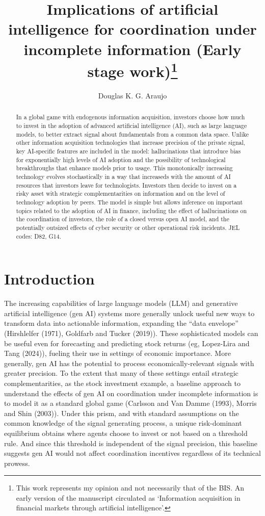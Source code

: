 \documentclass[
]{article}
\title{Implications of artificial intelligence for coordination under
incomplete information (Early stage work)\thanks{This work represents my
opinion and not necessarily that of the BIS. An early version of the
manuscript circulated as `Information acquisition in financial markets
through artificial intelligence'.}}
\author{Douglas K. G. Araujo}
\affil{%
                  Bank for International
Settlements, douglas.araujo@bis.org
              }
\date{}
\theoremstyle{plain}
\theoremstyle{definition}
\theoremstyle{remark}
\begin{document}
\maketitle
\begin{abstract}
In a global game with endogenous information acquisition, investors
choose how much to invest in the adoption of advanced artificial
intelligence (AI), such as large language models, to better extract
signal about fundamentals from a common data space. Unlike other
information acquisition technologies that increase precision of the
private signal, key AI-specific features are included in the model:
hallucinations that introduce bias for exponentially high levels of AI
adoption and the possibility of technological breakthroughs that enhance
models prior to usage. This monotonically increasing technology evolves
stochastically in a way that increaseds with the amount of AI resources
that investors leave for technologists. Investors then decide to invest
on a risky asset with strategic complementarities on information and on
the level of technology adoption by peers. The model is simple but
allows inference on important topics related to the adoption of AI in
finance, including the effect of hallucinations on the coordination of
investors, the role of a closed versus open AI model, and the
potentially outsized effects of cyber security or other operational risk
incidents. JEL codes: D82, G14.
\end{abstract}

\section{Introduction}\label{introduction}

The increasing capabilities of large language models (LLM) and
generative artificial intelligence (gen AI) systems more generally
unlock useful new ways to transform data into actionable information,
expanding the ``data envelope'' (Hirshlelfer (1971), Goldfarb and Tucker
(2019)). These sophisticated models can be useful even for forecasting
and predicting stock returns (eg, Lopez-Lira and Tang (2024)), fueling
their use in settings of economic importance. More generally, gen AI has
the potential to process economically-relevant signals with greater
precision. To the extent that many of these settings entail strategic
complementarities, as the stock investment example, a baseline approach
to understand the effects of gen AI on coordination under incomplete
information is to model it as a standard global game (Carlsson and Van
Damme (1993), Morris and Shin (2003)). Under this prism, and with
standard assumptions on the common knowledge of the signal generating
process, a unique risk-dominant equilibrium obtains where agents choose
to invest or not based on a threshold rule. And since this threshold is
independent of the signal precision, this baseline suggests gen AI would
not affect coordination incentives regardless of its technical prowess.
\end{document}
